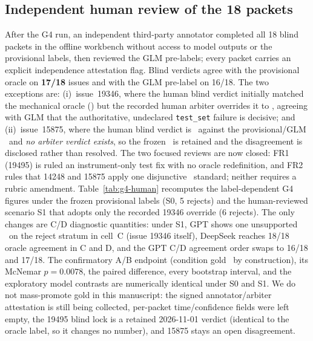 \subsection{Independent human review of the 18 packets}
\label{sec:g4-human}
After the G4 run, an independent third-party annotator completed all 18
blind packets in the offline workbench without access to model outputs or
the provisional labels, then reviewed the GLM pre-labels; every packet
carries an explicit independence attestation flag. Blind verdicts agree
with the provisional oracle on \textbf{17/18} issues and with the GLM
pre-label on 16/18. The two exceptions are: (i)~issue~19346, where the
human blind verdict initially matched the mechanical oracle (\ACCEPT) but
the recorded human arbiter overrides it to \REJECT, agreeing with GLM that
the authoritative, undeclared \texttt{test\_set} failure is decisive; and
(ii)~issue~15875, where the human blind verdict is \ACCEPT\ against the
provisional/GLM \REJECT\ and \emph{no arbiter verdict exists}, so the
frozen \REJECT\ is retained and the disagreement is disclosed rather than
resolved. The two focused reviews are now closed: FR1 (19495) is ruled an
instrument-only test fix with no oracle redefinition, and FR2 rules that
14248 and 15875 apply one disjunctive \REJECT\ standard; neither requires a
rubric amendment. Table~\ref{tab:g4-human} recomputes the label-dependent
G4 figures under the frozen provisional labels (S0, 5 rejects) and the
human-reviewed scenario S1 that adopts only the recorded 19346 override
(6 rejects). The only changes are C/D diagnostic quantities: under S1,
GPT shows one unsupported \ACCEPT\ on the reject stratum in cell~C (issue
19346 itself), DeepSeek reaches 18/18 oracle agreement in C and D, and the
GPT C/D agreement order swaps to 16/18 and 17/18. The confirmatory A/B
endpoint (condition gold \NEED\ by construction), its McNemar $p=0.0078$,
the paired difference, every bootstrap interval, and the exploratory
model contrasts are numerically identical under S0 and S1. We do not
mass-promote gold in this manuscript: the signed annotator/arbiter
attestation is still being collected, per-packet time/confidence fields
were left empty, the 19495 blind lock is a retained 2026-11-01 verdict
(identical to the oracle label, so it changes no number), and 15875 stays
an open disagreement.

